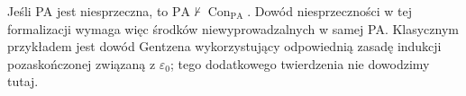 \begin{wniosek}\label{res:12:3}
Jeśli PA jest niesprzeczna, to $\mathrm{PA}\nvdash\operatorname{Con}_{\mathrm{PA}}$. Dowód niesprzeczności w tej formalizacji wymaga więc środków niewyprowadzalnych w samej PA. Klasycznym przykładem jest dowód Gentzena wykorzystujący odpowiednią zasadę indukcji pozaskończonej związaną z $\varepsilon_0$; tego dodatkowego twierdzenia nie dowodzimy tutaj.
\end{wniosek}

